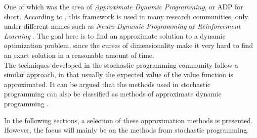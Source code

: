 One of which was the area of \textit{Approximate Dynamic Programming}, or ADP \cite{Powell_Perspectives_of_ADP} for short.
According to \cite{Powell_solving_Curses_of_Dimensionality}, this framework is used in many research communities, only under different names such as 
\textit{Neuro-Dynamic Programming} \cite{Neuro-dynamic-programming} or \textit{Reinforcement Learning} \cite{SuttonBartoRL}.
The goal here is to find an approximate solution to a dynamic optimization problem, since the curses of dimensionality make it very hard to find an exact solution in a reasonable amount of time. \\
The techniques developed in the stochastic programming community follow a similar approach, in that usually the expected value of the value function is approximated.
It can be argued that the methods used in stochastic programming can also be classified as methods of approximate dynamic programming \cite{POWELL2019795}.

In the following sections, a selection of these approximation methods is presented.
However, the focus will mainly be on the methods from stochastic programming.
